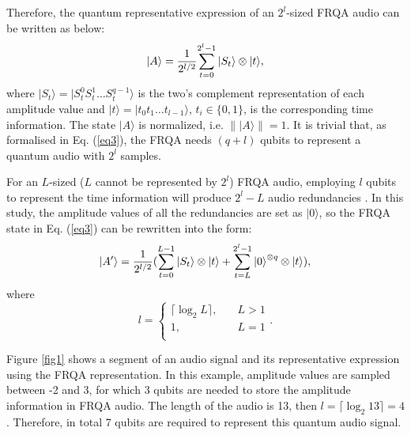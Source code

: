 \documentclass[10pt,journal,compsoc]{IEEEtran}
\begin{document}
Therefore, the quantum representative expression of an $2^l$-sized FRQA audio can be written as below:
\begin{equation}\label{eq3}
\vert A\rangle = {1\over 2^{l/2}}{\sum_{t=0}^{2^{l} - 1}{\vert S_t\rangle}\otimes \vert t\rangle},
\end{equation}
where $\vert S_t\rangle = \vert S_t^0S_t^1\ldots S_t^{q-1}\rangle$ is the two's complement representation of each amplitude value and $\vert t\rangle = \vert t_0t_1\ldots t_{l-1}\rangle$, $t_i\in\{0, 1\}$, is the corresponding time information. The state $\vert A\rangle$ is normalized, i.e. $\| \vert A \rangle \| = 1$. It is trivial that, as formalised in Eq. (\ref{eq3}), the FRQA needs $(q+l)$ qubits to represent a quantum audio with $2^{l}$ samples.

For an $L$-sized ($L$ cannot be represented by $2^{l}$) FRQA audio, employing $l$ qubits to represent the time information will produce $2^{l}-L$ audio redundancies \cite{9}. In this study, the amplitude values of all the redundancies are set as $\vert 0\rangle$, so the FRQA state in Eq. (\ref{eq3}) can be rewritten into the form:
\begin{equation}\label{eq4}
\vert A^\prime \rangle = {1\over 2^{l/2}}({\sum_{t=0}^{L - 1}{\vert S_t\rangle}\otimes \vert t\rangle} + {\sum_{t=L}^{2^l - 1}{\vert 0\rangle}^{\otimes q} \otimes \vert t\rangle}),
\end{equation}
where
\begin{equation}\label{eq5}
l = \left \{ \begin{array}{ll}
\lceil \log_{2}{L} \rceil , & \quad L > 1\\
1 , & \quad L = 1\\
\end{array}\right..
\end{equation}

Figure \ref{fig1} shows a segment of an audio signal and its representative expression using the FRQA representation. In this example, amplitude values are sampled between -2 and 3, for which 3 qubits are needed to store the amplitude information in FRQA audio. The length of the audio is 13, then $l = \lceil \log_{2}{13}\rceil = 4$. Therefore, in total 7 qubits are required to represent this quantum audio signal.
\end{document}
